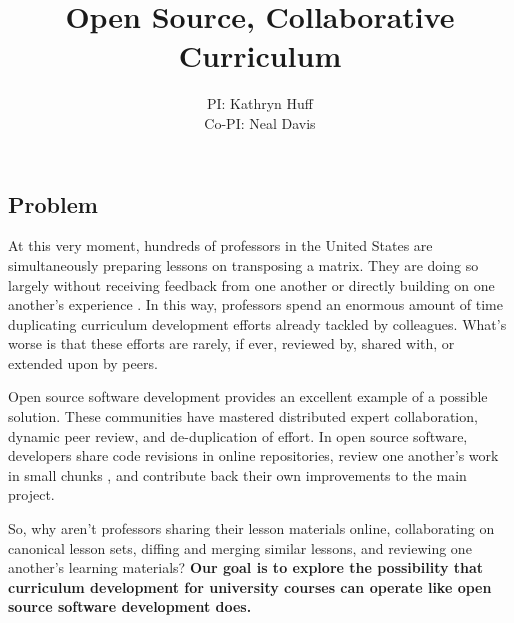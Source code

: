 \documentclass[11pt]{article}
\makeatletter
\newcommand{\authorname}{Kathryn~D.~Huff }
\newcommand{\authoremail}{katyhuff@illinois.edu}
\newcommand{\authorsite}{arfc.npre.illinois.edu}
\makeatother
\begin{document}
          \title{Open Source, Collaborative Curriculum}
          \author{PI: Kathryn Huff\\Co-PI: Neal Davis}
          \maketitle

          \pagestyle{fancy}
          \lhead{\textcolor{gray}{PI: \authorname (NPRE)\\\authoremail}}
          \rhead{\textcolor{gray}{Collaborative Open Source Curriculum Development\\}}
          \renewcommand{\headrulewidth}{0pt}
          \renewcommand{\footrulewidth}{0pt}
          \fancyfoot[C]{\footnotesize \textcolor{gray}{\authorsite}}

          \subsection*{Problem}
          At this very moment, hundreds of professors in the United States are 
          simultaneously preparing lessons on transposing a matrix.
          They are doing so largely without receiving feedback from one another 
          or directly building on one another's experience 
          \cite{green_building_2014}. In this way, 
          professors spend an enormous amount of time duplicating curriculum 
          development efforts already tackled by colleagues. What's worse is 
          that these efforts are rarely, if ever, reviewed by, shared with, or 
          extended upon by peers.
          
          Open source software development provides an excellent 
          example of a possible solution.
          These communities have mastered distributed expert collaboration, 
          dynamic peer review, and de-duplication of effort. In open source 
          software, developers share code revisions in online repositories, 
          review one another's work in small chunks \cite{wilson_best_2014}, 
          and contribute back their own improvements to the main project.

          So, why aren't professors sharing their lesson materials online, 
          collaborating on canonical lesson sets, diffing and merging similar 
          lessons, and reviewing one another's learning materials? \textbf{Our 
          goal is to explore the possibility that curriculum development for 
          university courses can operate like open source software development 
          does.}
           
\end{document}
